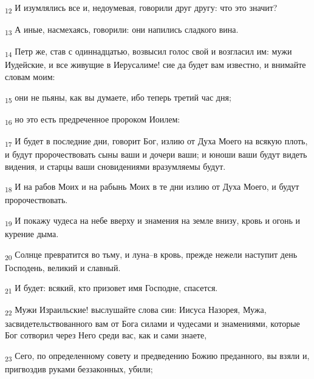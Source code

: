 \begin{tcolorbox}
\textsubscript{12} И изумлялись все и, недоумевая, говорили друг другу: что это значит?
\end{tcolorbox}
\begin{tcolorbox}
\textsubscript{13} А иные, насмехаясь, говорили: они напились сладкого вина.
\end{tcolorbox}
\begin{tcolorbox}
\textsubscript{14} Петр же, став с одиннадцатью, возвысил голос свой и возгласил им: мужи Иудейские, и все живущие в Иерусалиме! сие да будет вам известно, и внимайте словам моим:
\end{tcolorbox}
\begin{tcolorbox}
\textsubscript{15} они не пьяны, как вы думаете, ибо теперь третий час дня;
\end{tcolorbox}
\begin{tcolorbox}
\textsubscript{16} но это есть предреченное пророком Иоилем:
\end{tcolorbox}
\begin{tcolorbox}
\textsubscript{17} И будет в последние дни, говорит Бог, излию от Духа Моего на всякую плоть, и будут пророчествовать сыны ваши и дочери ваши; и юноши ваши будут видеть видения, и старцы ваши сновидениями вразумляемы будут.
\end{tcolorbox}
\begin{tcolorbox}
\textsubscript{18} И на рабов Моих и на рабынь Моих в те дни излию от Духа Моего, и будут пророчествовать.
\end{tcolorbox}
\begin{tcolorbox}
\textsubscript{19} И покажу чудеса на небе вверху и знамения на земле внизу, кровь и огонь и курение дыма.
\end{tcolorbox}
\begin{tcolorbox}
\textsubscript{20} Солнце превратится во тьму, и луна--в кровь, прежде нежели наступит день Господень, великий и славный.
\end{tcolorbox}
\begin{tcolorbox}
\textsubscript{21} И будет: всякий, кто призовет имя Господне, спасется.
\end{tcolorbox}
\begin{tcolorbox}
\textsubscript{22} Мужи Израильские! выслушайте слова сии: Иисуса Назорея, Мужа, засвидетельствованного вам от Бога силами и чудесами и знамениями, которые Бог сотворил через Него среди вас, как и сами знаете,
\end{tcolorbox}
\begin{tcolorbox}
\textsubscript{23} Сего, по определенному совету и предведению Божию преданного, вы взяли и, пригвоздив руками беззаконных, убили;
\end{tcolorbox}
